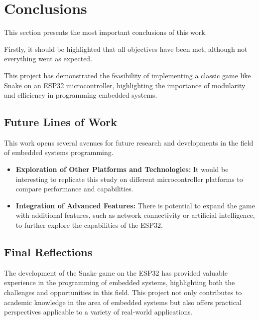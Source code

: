 \section{Conclusions}

This section presents the most important conclusions of this work.

Firstly, it should be highlighted that all objectives have been met, although not everything went as expected.

This project has demonstrated the feasibility of implementing a classic game like Snake on an ESP32 microcontroller, highlighting the importance of modularity and efficiency in programming embedded systems.

\subsection{Future Lines of Work}

This work opens several avenues for future research and developments in the field of embedded systems programming.

\begin{itemize}
    \item \textbf{Exploration of Other Platforms and Technologies:} It would be interesting to replicate this study on different microcontroller platforms to compare performance and capabilities.
    \item \textbf{Integration of Advanced Features:} There is potential to expand the game with additional features, such as network connectivity or artificial intelligence, to further explore the capabilities of the ESP32.
\end{itemize}

\subsection{Final Reflections}

The development of the Snake game on the ESP32 has provided valuable experience in the programming of embedded systems, highlighting both the challenges and opportunities in this field. This project not only contributes to academic knowledge in the area of embedded systems but also offers practical perspectives applicable to a variety of real-world applications.
